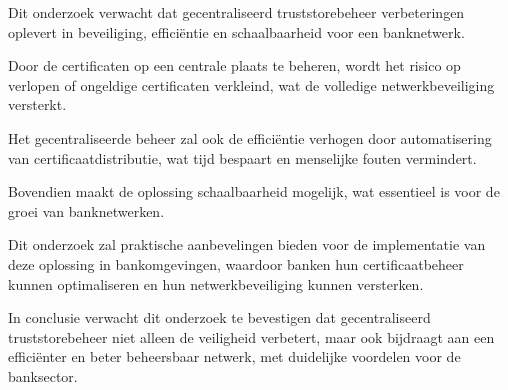 Dit onderzoek verwacht dat gecentraliseerd truststorebeheer verbeteringen oplevert in beveiliging, efficiëntie en schaalbaarheid voor een banknetwerk.

Door de certificaten op een centrale plaats te beheren, wordt het risico op verlopen of ongeldige certificaten verkleind, wat de volledige netwerkbeveiliging versterkt.

Het gecentraliseerde beheer zal ook de efficiëntie verhogen door automatisering van certificaatdistributie, wat tijd bespaart en menselijke fouten vermindert.

Bovendien maakt de oplossing schaalbaarheid mogelijk, wat essentieel is voor de groei van banknetwerken.

Dit onderzoek zal praktische aanbevelingen bieden voor de implementatie van deze oplossing in bankomgevingen, waardoor banken hun certificaatbeheer kunnen optimaliseren en hun netwerkbeveiliging kunnen versterken.

In conclusie verwacht dit onderzoek te bevestigen dat gecentraliseerd truststorebeheer niet alleen de veiligheid verbetert, maar ook bijdraagt aan een efficiënter en beter beheersbaar netwerk, met duidelijke voordelen voor de banksector. 